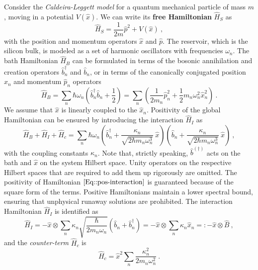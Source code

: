 	Consider the \textit{Caldeira-Leggett model} \cite{caldeira1981influence} for a quantum mechanical particle of mass $m$, moving in a potential $V(\hat{x})$. We can write its \textbf{free Hamiltonian} $\hat{H}_S$ as
	\begin{equation}
		\hat{H}_S =	\frac{1}{2m} \hat{p}^2 + V(\hat{x})~,
	\end{equation}
	with the position and momentum operators $\hat{x}$ and $\hat{p}$. The reservoir, which is the silicon bulk, is modeled as a set of harmonic oscillators with frequencies $\omega_n$. The bath Hamiltonian $\hat{H}_B$ can be formulated in terms of the bosonic annihilation and creation operators $\hat{b}_n^\dagger$ and $\hat{b}_n$, or in terms of the canonically conjugated position $\hat{x}_n$ and momentum $\hat{p}_n$ operators
	\begin{equation}
		\hat{H}_B =	\sum_n \hbar \omega_n \left(\hat{b}_n^\dagger \hat{b}_n + \frac{1}{2} \right) =	\sum_n \left(\frac{1}{2 m_n} \hat{p}_n^2 + \frac{1}{2} m_n \omega_n^2 \hat{x}_n^2 \right)~.
	\end{equation}
	We assume that $\hat{x}$ is linearly coupled to the $\hat{x}_n$. Positivity of the global Hamiltonian can be ensured by introducing the interaction $\hat{H}_I$ as
	\begin{equation} \label{Eq::pos-interaction}
		\hat{H}_B + \hat{H}_I + \hat{H}_c  =	\sum_n \hbar \omega_n \left(\hat{b}_n^\dagger  +   \frac{\kappa_n}{\sqrt{2 \hbar m_n \omega_n^3}}~\hat{x} \right) \left(\hat{b}_n  + \frac{\kappa_n}{\sqrt{2 \hbar m_n \omega_n^3}}~\hat{x}\right) ~,
	\end{equation}
	with the coupling constants $\kappa_n$.
	Note that, strictly speaking, $\hat{b}^{(\dagger)}$ acts on the bath and $\hat{x}$ on the system Hilbert space. Unity operators on the respective Hilbert spaces that are required to add them up rigorously are omitted. The positivity of Hamiltonian $\eqref{Eq::pos-interaction}$ is guaranteed because of the square form of the terms.  Positive Hamiltonians maintain a lower spectral bound, ensuring that unphysical runaway solutions are prohibited.	The interaction Hamiltonian $\hat{H}_I$ is identified as
	\begin{equation}
		\hat{H}_I =	-\hat{x} \otimes \sum_n \kappa_n \sqrt{\frac{\hbar}{2 m_n \omega_n}} \left(\hat{b}_n + \hat{b}_n^\dagger\right) = - \hat{x} \otimes \sum_n \kappa_n \hat{x}_n	 =:	- \hat{x} \otimes \hat{B} ~,
	\end{equation}
	and the \textit{counter-term} $\hat{H}_c$ is
	\begin{equation} \label{Eq::counter-term}
		\hat{H}_c =	\hat{x}^2 \sum_n \frac{\kappa_n^2}{2 m_n \omega_n^2} ~.
	\end{equation}
